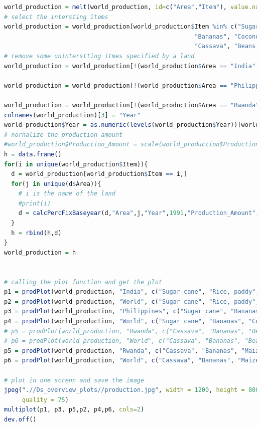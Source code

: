 \documentclass[11pt]{article}
\begin{document}
\begin{lstlisting}[language= R]
world_production = melt(world_production, id=c("Area","Item"), value.name = "Production_Amount")
# select the intersting items
world_production = world_production[world_production$Item %in% c("Sugar cane", "Rice, paddy", "Wheat", "Potatoes",
                                                     "Bananas", "Coconuts",
                                                     "Cassava", "Beans, dry", "Maize", "Sweet potatoes"),]
# remove some uninterstting itmes specified by a land
world_production = world_production[!(world_production$Area == "India" & world_production$Item %in% c("Cassava", "Bananas", "Beans, dry", "Maize", "Sweet potatoes", "Coconuts")),]

world_production = world_production[!(world_production$Area == "Philippines" & world_production$Item %in% c("Cassava", "Wheat", "Beans, dry", "Maize", "Sweet potatoes", "Potatoes")),]

world_production = world_production[!(world_production$Area == "Rwanda" & world_production$Item %in% c("Wheat", "Sugar cane", "Coconuts")),]
colnames(world_production)[3] = "Year"
world_production$Year = as.numeric(levels(world_production$Year))[world_production$Year] 
# nornalize the production amount
#world_production$Production_Amount = scale(world_production$Production_Amount)
h = data.frame()
for(i in unique(world_production$Item)){
  d = world_production[world_production$Item == i,]
  for(j in unique(d$Area)){
    # i is the name of the land 
    #print(i)
    d = calcPercFixBaseyear(d,"Area",j,"Year",1991,"Production_Amount", "Percentage")
  }
  h = rbind(h,d)
}
world_production = h


# calling the plot function and get the plot
p1 = prodPlot(world_production, "India", c("Sugar cane", "Rice, paddy", "Wheat", "Potatoes"))
p2 = prodPlot(world_production, "World", c("Sugar cane", "Rice, paddy", "Wheat", "Potatoes"))
p3 = prodPlot(world_production, "Philippines", c("Sugar cane", "Bananas", "Coconuts", "Rice, paddy"))
p4 = prodPlot(world_production, "World", c("Sugar cane", "Bananas", "Coconuts", "Rice, paddy"))
# p5 = prodPlot(world_production, "Rwanda", c("Cassava", "Bananas", "Beans, dry", "Maize", "Sweet potatoes", "Potatoes", "Rice, paddy"))
# p6 = prodPlot(world_production, "World", c("Cassava", "Bananas", "Beans, dry", "Maize", "Sweet potatoes", "Potatoes", "Rice, paddy"))
p5 = prodPlot(world_production, "Rwanda", c("Cassava", "Bananas", "Maize", "Sweet potatoes"))
p6 = prodPlot(world_production, "World", c("Cassava", "Bananas", "Maize", "Sweet potatoes"))

# plot in one screnn and save the image 
jpeg(".//Ds_overview_plots//production.jpg", width = 1200, height = 800, units = "px", pointsize = 12,
     quality = 75)
multiplot(p1, p3, p5,p2, p4,p6, cols=2)
dev.off()


\end{lstlisting}
\end{document}
